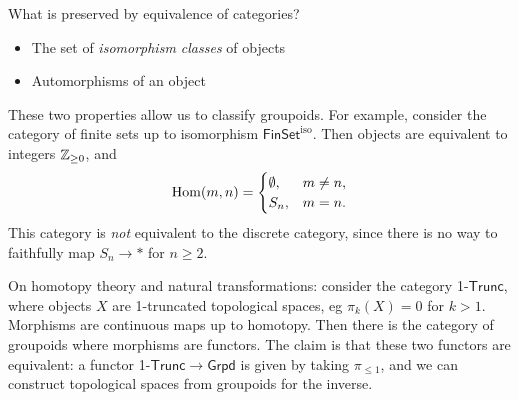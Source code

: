What is preserved by equivalence of categories? 
\begin{itemize}
\setlength\itemsep{-.2em}
    \item The set of \emph{isomorphism classes} of objects
    \item Automorphisms of an object
\end{itemize}
These two properties allow us to classify groupoids. For example, consider the category of finite sets up to isomorphism $\mathsf{FinSet} ^{\mathrm{iso}}.$ Then objects are equivalent to integers $\mathbb{Z} _{\geq 0}$, and \[
    \operatorname{Hom} (m,n) =
    \begin{cases}
        \emptyset , & m\neq n,\\
        S_n ,&m=n.
    \end{cases}
\] This category is \emph{not} equivalent to the discrete category, since there is no way to faithfully map $S_n \to *$ for $n\geq 2$.

\begin{example}
On homotopy theory and natural transformations: consider the category 1-$\mathsf{Trunc} $, where objects $X$ are 1-truncated topological spaces, eg $\pi_k(X)=0$ for $k>1$. Morphisms are continuous maps up to homotopy. Then there is the category of groupoids where morphisms are functors. The claim is that these two functors are equivalent: a functor 1-$\mathsf{Trunc} \to \mathsf{Grpd} $ is given by taking $\pi _{\leq 1}$, and we can construct topological spaces from groupoids for the inverse.
\end{example}
